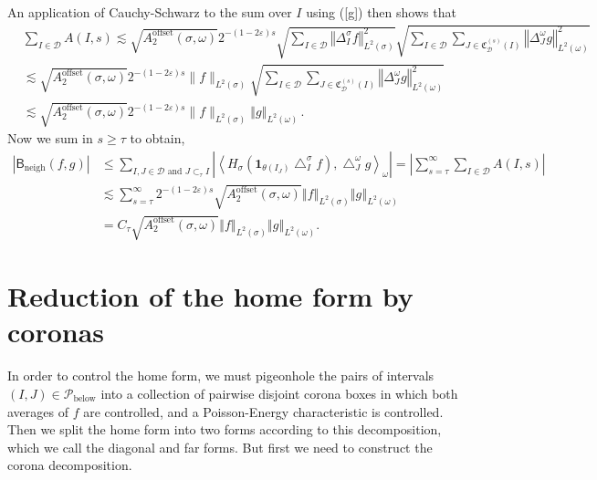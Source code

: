 \documentclass{amsart}%
\theoremstyle{plain}
\numberwithin{equation}{section}
\begin{document}
An application of Cauchy-Schwarz to the sum over $I$ using (\ref{g}) then
shows that
\begin{align*}
& \sum_{I\in\mathcal{D}}A(I,s)\lesssim\sqrt{A_{2}^{\operatorname*{offset}%
}\left(  \sigma,\omega\right)  }2^{-\left(  1-2\varepsilon\right)  s}%
\sqrt{\sum_{I\in\mathcal{D}}\left\Vert \Delta_{I}^{\sigma}f\right\Vert
_{L^{2}\left(  \sigma\right)  }^{2}}\sqrt{\sum_{I\in\mathcal{D}}\sum
_{J\in\mathfrak{C}_{\mathcal{D}}^{\left(  s\right)  }\left(  I\right)
}\left\Vert \Delta_{J}^{\omega}g\right\Vert _{L^{2}\left(  \omega\right)
}^{2}}\\
& \lesssim\sqrt{A_{2}^{\operatorname*{offset}}\left(  \sigma,\omega\right)
}2^{-\left(  1-2\varepsilon\right)  s}\lVert f\rVert_{L^{2}(\sigma)}\sqrt
{\sum_{I\in\mathcal{D}}\sum_{J\in\mathfrak{C}_{\mathcal{D}}^{\left(  s\right)
}\left(  I\right)  }\left\Vert \Delta_{J}^{\omega}g\right\Vert _{L^{2}\left(
\omega\right)  }^{2}}\\
& \lesssim\sqrt{A_{2}^{\operatorname*{offset}}\left(  \sigma,\omega\right)
}2^{-\left(  1-2\varepsilon\right)  s}\lVert f\rVert_{L^{2}(\sigma)}\left\Vert
g\right\Vert _{L^{2}(\omega)}\,.
\end{align*}
Now we sum in $s\geq\tau$ to obtain,
\begin{align*}
\left\vert \mathsf{B}_{\operatorname{neigh}}\left(  f,g\right)  \right\vert  &
\leq\sum_{I,J\in\mathcal{D}\text{ and }J\subset_{\tau}I}\left\vert
\left\langle H_{\sigma}\left(  \mathbf{1}_{\theta\left(  I_{J}\right)
}\bigtriangleup_{I}^{\sigma}f\right)  ,\bigtriangleup_{J}^{\omega
}g\right\rangle _{\omega}\right\vert =\left\vert \sum_{s=\tau}^{\infty}%
\sum_{I\in\mathcal{D}}A(I,s)\right\vert \\
& \lesssim\sum_{s=\tau}^{\infty}2^{-\left(  1-2\varepsilon\right)  s}%
\sqrt{A_{2}^{\operatorname*{offset}}\left(  \sigma,\omega\right)  }\left\Vert
f\right\Vert _{L^{2}(\sigma)}\left\Vert g\right\Vert _{L^{2}(\omega)}\\
& =C_{\tau}\sqrt{A_{2}^{\operatorname*{offset}}\left(  \sigma,\omega\right)
}\left\Vert f\right\Vert _{L^{2}(\sigma)}\left\Vert g\right\Vert
_{L^{2}(\omega)}.
\end{align*}


\section{Reduction of the home form by coronas}

In order to control the home form, we must pigeonhole the pairs of intervals
$\left(  I,J\right)  \in\mathcal{P}_{\operatorname{below}}$ into a collection
of pairwise disjoint corona boxes in which both averages of $f$ are
controlled, and a Poisson-Energy characteristic is controlled. Then we split
the home form into two forms according to this decomposition, which we call
the diagonal and far forms. But first we need to construct the corona decomposition.
\end{document}
